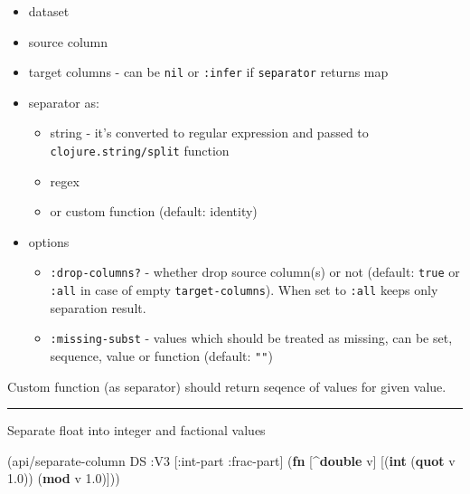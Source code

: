 \documentclass[]{article}
\newenvironment{Shaded}{\begin{snugshade}}{\end{snugshade}}
\newcommand{\AttributeTok}[1]{\textcolor[rgb]{0.77,0.63,0.00}{#1}}
\newcommand{\FloatTok}[1]{\textcolor[rgb]{0.00,0.00,0.81}{#1}}
\newcommand{\KeywordTok}[1]{\textcolor[rgb]{0.13,0.29,0.53}{\textbf{#1}}}
\newcommand{\NormalTok}[1]{#1}
\providecommand{\tightlist}{%
  \setlength{\itemsep}{0pt}\setlength{\parskip}{0pt}}
\begin{document}
\begin{itemize}
\tightlist
\item
  dataset
\item
  source column
\item
  target columns - can be \texttt{nil} or \texttt{:infer} if
  \texttt{separator} returns map
\item
  separator as:

  \begin{itemize}
  \tightlist
  \item
    string - it's converted to regular expression and passed to
    \texttt{clojure.string/split} function
  \item
    regex
  \item
    or custom function (default: identity)
  \end{itemize}
\item
  options

  \begin{itemize}
  \tightlist
  \item
    \texttt{:drop-columns?} - whether drop source column(s) or not
    (default: \texttt{true} or \texttt{:all} in case of empty
    \texttt{target-columns}). When set to \texttt{:all} keeps only
    separation result.
  \item
    \texttt{:missing-subst} - values which should be treated as missing,
    can be set, sequence, value or function (default: \texttt{""})
  \end{itemize}
\end{itemize}

Custom function (as separator) should return seqence of values for given
value.

\begin{center}\rule{0.5\linewidth}{0.5pt}\end{center}

Separate float into integer and factional values

\begin{Shaded}
\begin{Highlighting}[]
\NormalTok{(api/separate-column DS }\AttributeTok{:V3}\NormalTok{ [}\AttributeTok{:int-part} \AttributeTok{:frac-part}\NormalTok{] (}\KeywordTok{fn}\NormalTok{ [^}\KeywordTok{double}\NormalTok{ v]}
\NormalTok{                                                     [(}\KeywordTok{int}\NormalTok{ (}\KeywordTok{quot}\NormalTok{ v }\FloatTok{1.0}\NormalTok{))}
\NormalTok{                                                      (}\KeywordTok{mod}\NormalTok{ v }\FloatTok{1.0}\NormalTok{)]))}
\end{Highlighting}
\end{Shaded}
\end{document}
